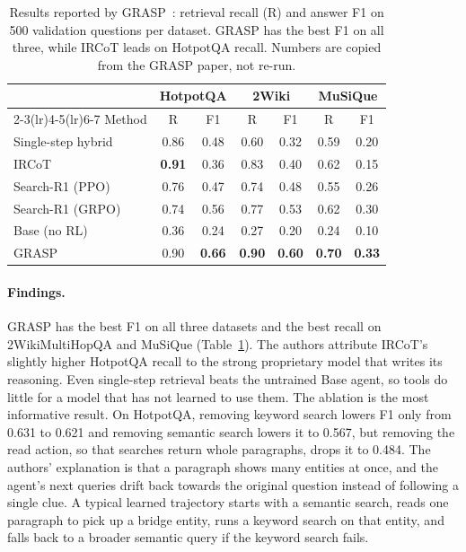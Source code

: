 \documentclass[pdflatex,sn-mathphys-num]{sn-jnl}%
\begin{document}
\begin{table}[t]
\centering
\caption{Results reported by GRASP~\cite{gandhi2026grasp}: retrieval recall (R) and answer F1 on 500 validation questions per dataset. GRASP has the best F1 on all three, while IRCoT leads on HotpotQA recall. Numbers are copied from the GRASP paper, not re-run.}
\label{tab:grasp}
\setlength{\tabcolsep}{4pt}
\footnotesize
\begin{tabular}{@{}lcccccc@{}}
\toprule
 & \multicolumn{2}{c}{HotpotQA} & \multicolumn{2}{c}{2Wiki} & \multicolumn{2}{c}{MuSiQue} \\
\cmidrule(lr){2-3}\cmidrule(lr){4-5}\cmidrule(lr){6-7}
Method & R & F1 & R & F1 & R & F1 \\
\midrule
Single-step hybrid   & 0.86 & 0.48 & 0.60 & 0.32 & 0.59 & 0.20 \\
IRCoT                & \textbf{0.91} & 0.36 & 0.83 & 0.40 & 0.62 & 0.15 \\
Search-R1 (PPO)      & 0.76 & 0.47 & 0.74 & 0.48 & 0.55 & 0.26 \\
Search-R1 (GRPO)     & 0.74 & 0.56 & 0.77 & 0.53 & 0.62 & 0.30 \\
Base (no RL)         & 0.36 & 0.24 & 0.27 & 0.20 & 0.24 & 0.10 \\
GRASP                & 0.90 & \textbf{0.66} & \textbf{0.90} & \textbf{0.60} & \textbf{0.70} & \textbf{0.33} \\
\bottomrule
\end{tabular}
\end{table}

\paragraph{Findings.} GRASP has the best F1 on all three datasets and the best recall on 2WikiMultiHopQA and MuSiQue (Table~\ref{tab:grasp}). The authors attribute IRCoT's slightly higher HotpotQA recall to the strong proprietary model that writes its reasoning. Even single-step retrieval beats the untrained Base agent, so tools do little for a model that has not learned to use them. The ablation is the most informative result. On HotpotQA, removing keyword search lowers F1 only from 0.631 to 0.621 and removing semantic search lowers it to 0.567, but removing the read action, so that searches return whole paragraphs, drops it to 0.484. The authors' explanation is that a paragraph shows many entities at once, and the agent's next queries drift back towards the original question instead of following a single clue. A typical learned trajectory starts with a semantic search, reads one paragraph to pick up a bridge entity, runs a keyword search on that entity, and falls back to a broader semantic query if the keyword search fails.
\end{document}
